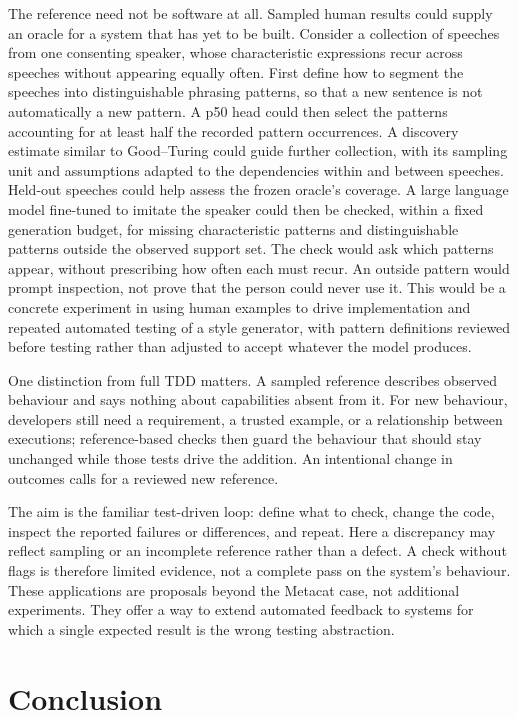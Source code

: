 \documentclass[10pt,letterpaper]{article}
\begin{document}
The reference need not be software at all. Sampled human results could supply an oracle
for a system that has yet to be built. Consider a collection of speeches from one
consenting speaker, whose characteristic expressions recur across speeches without
appearing equally often. First define how to segment the speeches into distinguishable
phrasing patterns, so that a new sentence is not automatically a new pattern. A p50 head
could then select the patterns accounting for at least half the recorded pattern
occurrences. A discovery estimate similar to Good--Turing could guide further collection,
with its sampling unit and assumptions adapted to the dependencies within and between
speeches. Held-out speeches could help assess the frozen oracle's coverage. A large
language model fine-tuned to imitate the speaker could then be checked, within a fixed
generation budget, for missing characteristic patterns and distinguishable patterns
outside the observed support set. The check would ask which patterns appear, without
prescribing how often each must recur. An outside pattern would prompt inspection, not
prove that the person could never use it. This would be a concrete experiment in using
human examples to drive implementation and repeated automated testing of a style
generator, with pattern definitions reviewed before testing rather than adjusted to accept
whatever the model produces.

One distinction from full TDD matters. A sampled reference describes observed behaviour
and says nothing about capabilities absent from it. For new behaviour, developers still
need a requirement, a trusted example, or a relationship between executions;
reference-based checks then guard the behaviour that should stay unchanged while those
tests drive the addition. An intentional change in outcomes calls for a reviewed new
reference.

The aim is the familiar test-driven loop: define what to check, change the code, inspect
the reported failures or differences, and repeat. Here a discrepancy may reflect sampling
or an incomplete reference rather than a defect. A check without flags is therefore
limited evidence, not a complete pass on the system's behaviour. These applications are
proposals beyond the Metacat case, not additional experiments. They offer a way to extend
automated feedback to systems for which a single expected result is the wrong testing
abstraction.

\section{Conclusion}\label{sec:conclusion}
\end{document}
